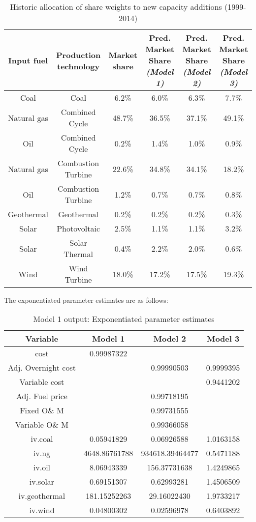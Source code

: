 \documentclass[10pt]{amsart}
\begin{document}
\begin{table}[H]
\caption{Historic allocation of share weights to new capacity additions (1999-2014)}
\centering
\begin{tabular}{c c c c c c}
\hline
\hline
Input fuel & Production technology & Market share & \makecell{Pred. Market Share \\ {\footnotesize\textit{(Model 1)}}} & \makecell{Pred. Market Share \\ {\footnotesize\textit{(Model 2)}}} & \makecell{Pred. Market Share \\ {\footnotesize\textit{(Model 3)}}} \\ [0.5ex]
\hline
Coal & Coal & 6.2\% & 6.0\% &6.3\% &7.7\% \\
Natural gas & Combined Cycle & 48.7\% & 36.5\% & 37.1\% & 49.1\% \\
Oil & Combined Cycle & 0.2\% & 1.4\% & 1.0\% & 0.9\% \\
Natural gas & Combustion Turbine & 22.6\% & 34.8\% & 34.1\% & 18.2\%\\
Oil & Combustion Turbine & 1.2\% & 0.7\% & 0.7\% & 0.8\% \\
Geothermal & Geothermal & 0.2\% & 0.2\% & 0.2\% & 0.3\% \\
Solar & Photovoltaic & 2.5\% & 1.1\% & 1.1\% & 3.2\%\\
Solar & Solar Thermal & 0.4\% & 2.2\% & 2.0\% & 0.6\%\\
Wind & Wind Turbine & 18.0\% & 17.2\% & 17.5\% & 19.3\% \\ [1ex]
\hline
\end{tabular}
\label{table:perc}
\end{table}

The exponentiated parameter estimates are as follows:
\begin{table}[H]
\caption{Model 1 output: Exponentiated parameter estimates}
\centering
\begin{tabular}{c c c c}
\hline
\hline
Variable & Model 1 & Model 2 & Model 3\\ [0.5ex]
\hline
cost & 0.99987322 & & \\
Adj. Overnight cost & & 0.99990503 & 0.9999395\\
Variable cost & & & 0.9441202 \\
Adj. Fuel price & & 0.99718195 &\\
Fixed O\& M & & 0.99731555 &\\
Variable O\& M & & 0.99366058 &\\
iv.coal & 0.05941829 & 0.06926588 & 1.0163158 \\
iv.ng & 4648.86761788 & 934618.39464477 & 0.5471188\\
iv.oil & 8.06943339 & 156.37731638 & 1.4249865\\
iv.solar & 0.69151307 & 0.62993281 & 1.4506509\\
iv.geothermal & 181.15252263 & 29.16022430 & 1.9733217\\
iv.wind & 0.04800302 & 0.02596978 & 0.6403892 \\ [1ex]
\hline
\end{tabular}
\label{exponentiated}
\end{table}
\end{document}
